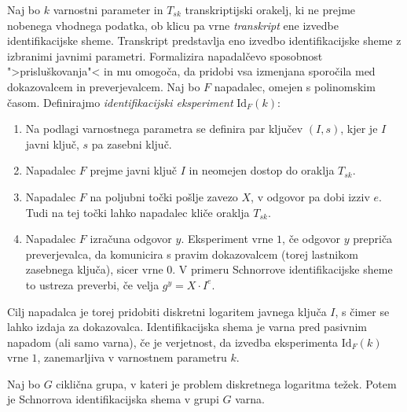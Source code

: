 \begin{definicija}
\label{def:id-sec}
    Naj bo $k$ varnostni parameter in $T_{sk}$ transkriptijski orakelj, ki ne prejme nobenega vhodnega
    podatka, ob klicu pa vrne \textit{transkript} ene izvedbe identifikacijske sheme. Transkript
    predstavlja eno izvedbo identifikacijske sheme z izbranimi javnimi parametri. Formalizira
    napadalčevo sposobnost ">prisluškovanja"< in mu omogoča, da pridobi vsa izmenjana sporočila med
    dokazovalcem in preverjevalcem. Naj bo $F$ napadalec, omejen s polinomskim časom. Definirajmo 
    \textit{identifikacijski eksperiment} $\text{Id}_F(k)$:
    \begin{enumerate}
        \item Na podlagi varnostnega parametra se definira par ključev $(I, s)$, kjer je $I$
            javni ključ, $s$ pa zasebni ključ.
        \item Napadalec $F$ prejme javni ključ $I$ in neomejen dostop do oraklja $T_{sk}$.
        \item Napadalec $F$ na poljubni točki pošlje zavezo $X$, v odgovor pa dobi izziv $e$. Tudi
            na tej točki lahko napadalec kliče oraklja $T_{sk}$.
        \item Napadalec $F$ izračuna odgovor $y$. Eksperiment vrne $1$, če odgovor $y$ prepriča
            preverjevalca, da komunicira s pravim dokazovalcem (torej lastnikom zasebnega ključa),
            sicer vrne $0$. V primeru Schnorrove identifikacijske sheme to ustreza preverbi, če
            velja $g^y = X \cdot I^e$.
    \end{enumerate}
    Cilj napadalca je torej pridobiti diskretni logaritem javnega ključa $I$, s čimer se lahko izdaja
    za dokazovalca. Identifikacijska shema je varna pred pasivnim napadom (ali samo varna), če je
    verjetnost, da izvedba eksperimenta $\text{Id}_F(k)$ vrne $1$, zanemarljiva v varnostnem
    parametru $k$.
\end{definicija}

\begin{izrek}
\label{izrek:schnorr-id-sec}
    Naj bo $G$ ciklična grupa, v kateri je problem diskretnega logaritma težek. Potem je Schnorrova
    identifikacijska shema v grupi $G$ varna.
\end{izrek}

